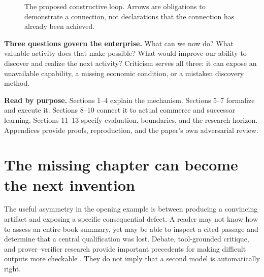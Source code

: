 \documentclass[11pt,a4paper]{article}
\begin{document}
\begin{figure}[H]\centering
{}
\caption{The proposed constructive loop. Arrows are obligations to demonstrate a connection, not declarations that the connection has already been achieved.}
\end{figure}

\textbf{Three questions govern the enterprise.} What can we now do? What valuable activity does that make possible? What would improve our ability to discover and realize the next activity? Criticism serves all three: it can expose an unavailable capability, a missing economic condition, or a mistaken discovery method.

\textbf{Read by purpose.} Sections 1--4 explain the mechanism. Sections 5--7 formalize and execute it. Sections 8--10 connect it to actual commerce and successor learning. Sections 11--13 specify evaluation, boundaries, and the research horizon. Appendices provide proofs, reproduction, and the paper's own adversarial review.
\newpage
\setcounter{tocdepth}{1}
\tableofcontents
\newpage
\section{The missing chapter can become the next invention}
The useful asymmetry in the opening example is between producing a convincing artifact and exposing a specific consequential defect. A reader may not know how to assess an entire book summary, yet may be able to inspect a cited passage and determine that a central qualification was lost. Debate, tool-grounded critique, and prover--verifier research provide important precedents for making difficult outputs more checkable \cite{irving,gou,kirchner}. They do not imply that a second model is automatically right.
\end{document}
